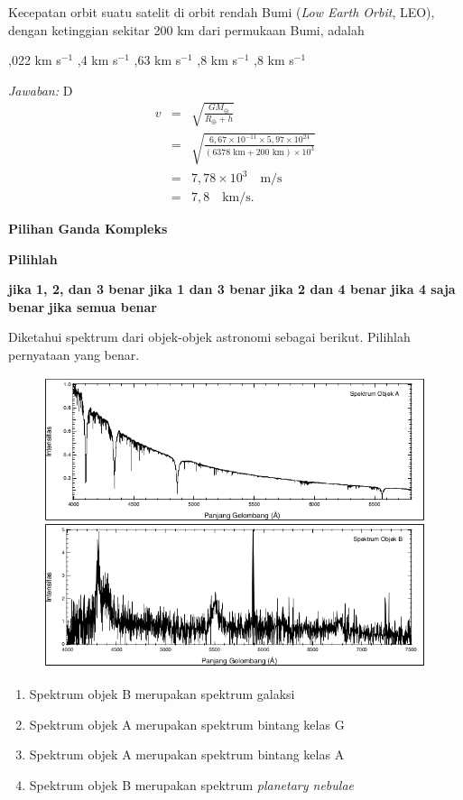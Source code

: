 \documentclass[11pt,fleqn]{exam}
\begin{document}
\begin{questions}
\question Kecepatan orbit suatu satelit di orbit rendah Bumi (\textit{Low Earth Orbit}, LEO), dengan ketinggian sekitar 200 km dari permukaan Bumi, adalah
\begin{choices}
,022 km s$^{-1}$
,4 km s$^{-1}$
,63 km s$^{-1}$
,8 km s$^{-1}$
,8 km s$^{-1}$
\end{choices}

\textit{Jawaban: } D\\
\begin{eqnarray*}
v&=&\sqrt{\frac{GM_{\oplus}}{R_{\oplus}+h}}\\
&=&\sqrt{\frac{6,67\times 10^{-11}\times 5,97\times 10^{24}}{(6378\text{ km}+200\text{ km})\times 10^3}}\\
&=&7,78\times 10^3 \quad \text{m/s}\\
&=&7,8 \quad \text{km/s}.
\end{eqnarray*}

\vspace{0.5cm}
\textbf{Pilihan Ganda Kompleks}

\textbf{Pilihlah}
\begin{choices}
\choice \textbf{jika 1, 2, dan 3 benar}
\choice \textbf{jika 1 dan 3 benar}
\choice \textbf{jika 2 dan 4 benar}
\choice \textbf{jika 4 saja benar}
\choice \textbf{jika semua benar}
\end{choices}

\question Diketahui spektrum dari objek-objek astronomi sebagai berikut. Pilihlah pernyataan yang benar.

\begin{figure}[ht!]
\centering
\includegraphics[scale=0.55]{spektrum.png}
\end{figure}
\begin{enumerate}
	\item Spektrum objek B merupakan spektrum galaksi
	\item Spektrum objek A merupakan spektrum bintang kelas G
	\item Spektrum objek A merupakan spektrum bintang kelas A
	\item Spektrum objek B merupakan spektrum \textit{planetary nebulae}
\end{enumerate}


\end{questions}
\end{document}
